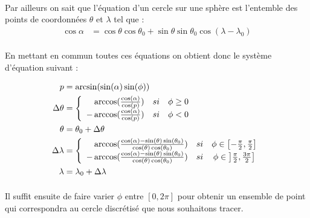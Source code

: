 \documentclass[a4paper]{report}
\begin{document}
\paragraph{} Par ailleurs on sait que l'équation d'un cercle sur une sphère est l'entemble des points de coordonnées $\theta$ et $\lambda$ tel que \cite{ref_cercle_sphere}:
\begin{align}
	\cos\alpha &= \cos\theta\cos\theta_{0} + \sin\theta\sin\theta_{0}\cos(\lambda - \lambda_{0})
\end{align}

\paragraph{} En mettant en commun toutes ces équations on obtient donc le système d'équation suivant :

\begin{align} 
	p&=\arcsin(\sin(\alpha)\sin(\phi)) \\
	\Delta \theta &= 
	\left \{
	\begin{array}{r c l}
		\arccos(\frac{\cos(\alpha)}{\cos(p)}) \quad si& \phi \ge 0 \\
		-\arccos(\frac{\cos(\alpha)}{\cos(p)}) \quad si& \phi < 0\\
	\end{array}
	\right. \\
	\theta &= \theta_{0} + \Delta \theta \\
	\Delta \lambda &= 
	\left \{
	\begin{array}{r c l}
		\arccos(\frac{\cos(\alpha) - \sin(\theta)\sin(\theta_0)}{\cos(\theta)\cos(\theta_0)}) \quad si& \phi \in \left[ -\frac{\pi}{2},\frac{\pi}{2} \right]\\
		-\arccos(\frac{\cos(\alpha) - \sin(\theta)\sin(\theta_0)}{\cos(\theta)\cos(\theta_0)}) \quad si& \phi \in \left] \frac{\pi}{2},\frac{3\pi}{2} \right]\\
	\end{array}
	\right. \\
	\lambda &= \lambda_{0} + \Delta \lambda 
\end{align}

\paragraph{} Il suffit ensuite de faire varier $\phi$ entre $\left[ 0, 2\pi \right]$ pour obtenir un ensemble de point qui correspondra au cercle discrétisé que nous souhaitons tracer.
\end{document}
